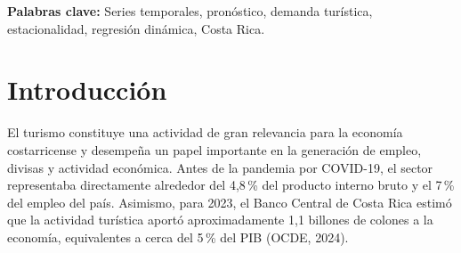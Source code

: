 \documentclass[12pt]{article}
\begin{document}
\begin{abstract}

El presente estudio tuvo como objetivo comparar la capacidad 
predictiva de diferentes modelos de series temporales para 
las llegadas internacionales de turistas por vía aérea a 
Costa Rica. Se utilizaron 204 observaciones mensuales 
correspondientes al periodo comprendido entre enero de 
2009 y diciembre de 2025, obtenidas del Instituto 
Costarricense de Turismo. Se evaluaron cuatro familias 
de modelos: suavizamiento exponencial, ARIMA/SARIMA, 
regresión y regresión dinámica.

La selección de los modelos se fundamentó en criterios 
de información, diagnóstico de residuos y medidas de 
precisión predictiva fuera de muestra, utilizando las 
observaciones de 2025 como conjunto de prueba. El modelo 
de regresión dinámica con tendencia lineal, estacionalidad 
mensual y errores ARIMA$(4,0,0)$ presentó el mejor 
desempeño, con un RMSE de 26.617,18 llegadas, un MAPE 
del 10,55\,\% y un MASE de 0,6270.

A partir del modelo seleccionado se generaron pronósticos 
mensuales para 2026, estimándose un total anual de 
aproximadamente 2.979.040 llegadas de turistas por vía 
aérea. Aunque no se encontró evidencia estadísticamente 
significativa de autocorrelación residual, se rechazó 
el supuesto de normalidad, lo que constituye una 
limitación para la interpretación de los intervalos 
de predicción. Los resultados obtenidos pueden contribuir 
a la planificación y toma de decisiones en el sector 
turístico costarricense.

\end{abstract}

\noindent\textbf{Palabras clave:} Series temporales, 
pronóstico, demanda turística, estacionalidad, 
regresión dinámica, Costa Rica.




\section{Introducción}

El turismo constituye una actividad de gran relevancia para 
la economía costarricense y desempeña un papel importante 
en la generación de empleo, divisas y actividad económica. 
Antes de la pandemia por COVID-19, el sector representaba 
directamente alrededor del 4,8\,\% del producto interno 
bruto y el 7\,\% del empleo del país. Asimismo, para 2023, 
el Banco Central de Costa Rica estimó que la actividad 
turística aportó aproximadamente 1,1 billones de colones 
a la economía, equivalentes a cerca del 5\,\% del PIB 
(OCDE, 2024).
\end{document}
